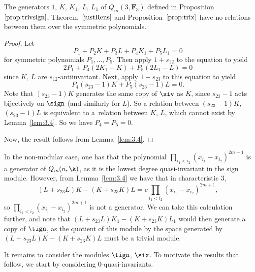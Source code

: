  \begin{Corollary}\label{cor:5gens}
 The generators $1$, $K$, $K_1$, $L$, $L_1$ of $Q_m(3,\mathbf{F}_3)$ defined in Proposition~$\ref{prop:trivsign}$, Theorem~$\ref{justRens}$ and Proposition~$\ref{prop:trix}$ have no relations between them over the symmetric polynomials.
 \end{Corollary}

 \begin{proof}
 Let
 \[P_1+P_2K+P_3L+P_4K_1+P_5L_1=0\]
 for symmetric polynomials $P_1,\dots,P_5$. Then apply $1+s_{12}$ to the equation to yield
 \[2P_1+P_4(2K_1-K)+P_5(2L_1-L)=0\]
 since $K$, $L$ are $s_{12}$-antiinvariant. Next, apply $1-s_{23}$ to this equation to yield
 \[P_4(s_{23}-1)K+P_5(s_{23}-1)L=0.\]
 Note that $(s_{23}-1)K$ generates the same copy of $\siv$ as $K$, since $s_{23}-1$ acts bijectively on $\sign$ (and similarly for $L$). So a relation between $(s_{23}-1)K$, $(s_{23}-1)L$ is equivalent to a~relation between $K$, $L$, which cannot exist by Lemma~\ref{lem:3.4}. So we have $P_4=P_5=0$.

 Now, the result follows from Lemma~\ref{lem:3.4}.
 \end{proof}

 \begin{Remark}\label{rem:sign}
 In the non-modular case, one has that the polynomial $\prod_{i_1<i_2}(x_{i_1}-x_{i_2})^{2m+1}$ is a generator of $Q_m(n,\k)$, as it is the lowest degree quasi-invariant in the sign module. However, from Lemma~\ref{lem:3.4} we have that in characteristic 3,
 \[(L+s_{23}L)K-(K+s_{23}K)L=c\prod_{i_1<i_2}(x_{i_1}-x_{i_2})^{2m+1},\]
 so $\prod_{i_1<i_2}(x_{i_1}-x_{i_2})^{2m+1}$ is not a generator. We can take this calculation further, and note that $(L+s_{23}L)K_1-(K+s_{23}K)L_1$ would then generate a copy of $\tign$, as the quotient of this module by the space generated by $(L+s_{23}L)K-(K+s_{23}K)L$ must be a trivial module.
 \end{Remark}

 It remains to consider the modules $\tign$, $\six$. To motivate the results that follow, we start by considering 0-quasi-invariants.


